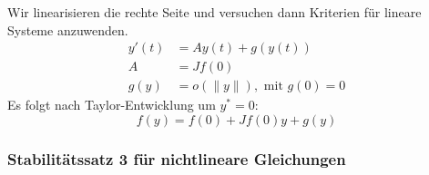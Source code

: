 \documentclass[a4paper]{article}
\begin{document}
Wir linearisieren die rechte Seite und versuchen dann Kriterien für
lineare Systeme anzuwenden.
\begin{align*}
	y' (t) &= A y(t) + g(y(t)) \\
	A &= J f(0) \\
	g(y) &= o( \| y \| ), 
	\text{ mit } g(0) = 0
\end{align*}
Es folgt nach Taylor-Entwicklung um $y^* = 0$:
\[
	f(y) = f( 0 ) + J f(0) y + g(y)
\] 

\subsubsection{Stabilitätssatz 3 für nichtlineare Gleichungen}
\end{document}
